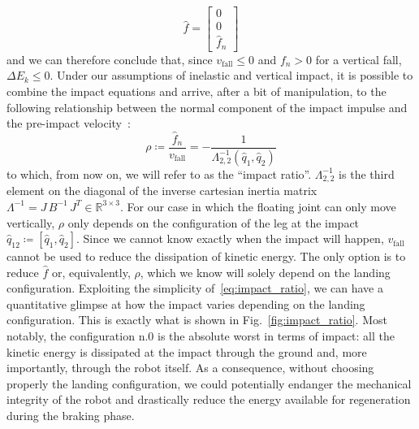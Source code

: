 \begin{equation}\label{eq:f_hat_simpl}
    \hat{f} = \begin{bmatrix}
0\\
0\\
\hat{f}_{n}
\end{bmatrix}
\end{equation}
and we can therefore conclude that, since $v_{\mathrm{fall}} \leq 0$ and $f_n > 0$ for a vertical fall, $\Delta E_{k} \leq 0$. 
Under our assumptions of inelastic and vertical impact, it is possible to combine the impact equations and arrive, after a bit of manipulation, to the following relationship between the normal component of the impact impulse and the pre-impact velocity~\cite{impact_dyn::tassi2022impact}:
\begin{equation}\label{eq:impact_ratio}
    \rho \coloneqq \dfrac{\hat{f}_n}{v_{\mathrm{fall}}} = -\dfrac{1}{\Lambda^{-1}_{2,2}(\hat{q}_1, \hat{q}_2)}
\end{equation}
to which, from now on, we will refer to as the \enquote{impact ratio}. $\Lambda^{-1}_{2,2}$ is the third element on the diagonal of the inverse cartesian inertia matrix $\Lambda^{-1} = J\,B^{-1}\,J^{T}\in\mathbb{R}^{3\times3}$. For our case in which the floating joint can only move vertically, $\rho$ only depends on the configuration of the leg at the impact $\hat{q}_{12}\coloneqq\left[\hat{q}_1,\hat{q}_2 \right]$.
Since we cannot know exactly when the impact will happen, $v_{\mathrm{fall}}$ cannot be used to reduce the dissipation of kinetic energy. The only option is to reduce $\hat{f}$ or, equivalently, $\rho$, which we know will solely depend on the landing configuration. 
Exploiting the simplicity of~\eqref{eq:impact_ratio}, we can have a quantitative glimpse at how the impact varies depending on the landing configuration. This is exactly what is shown in Fig.~\ref{fig:impact_ratio}. Most notably, the configuration n.$0$ is the absolute worst in terms of impact: all the kinetic energy is dissipated at the impact through the ground and, more importantly, through the robot itself. As a consequence, without choosing properly the landing configuration, we could potentially endanger the mechanical integrity of the robot and drastically reduce the energy available for regeneration during the braking phase.
